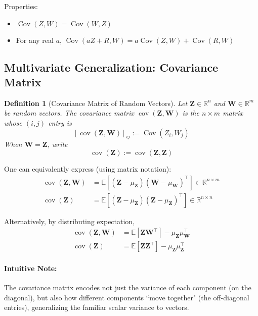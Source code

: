 \documentclass[12pt]{article}
\newtheorem{definition}{Definition}[section]
\begin{document}
Properties:
\begin{itemize}
    \item $\operatorname{Cov}(Z, W) = \operatorname{Cov}(W, Z)$
    \item For any real $a$, $\operatorname{Cov}(a Z + R, W) = a \operatorname{Cov}(Z, W) + \operatorname{Cov}(R, W)$
\end{itemize}

\subsection{Multivariate Generalization: Covariance Matrix}

\begin{definition}[Covariance Matrix of Random Vectors]
Let $\boldsymbol{Z} \in \mathbb{R}^n$ and $\boldsymbol{W} \in \mathbb{R}^m$ be random vectors.
The \emph{covariance matrix} $\operatorname{cov}(\boldsymbol{Z}, \boldsymbol{W})$ is the $n \times m$ matrix whose $(i,j)$ entry is
\[
    [\operatorname{cov}(\boldsymbol{Z}, \boldsymbol{W})]_{ij} := \operatorname{Cov}(Z_i, W_j)
\]
When $\boldsymbol{W} = \boldsymbol{Z}$, write
\[
    \operatorname{cov}(\boldsymbol{Z}) := \operatorname{cov}(\boldsymbol{Z}, \boldsymbol{Z})
\]
\end{definition}

\noindent
One can equivalently express (using matrix notation):
\begin{align}
    \operatorname{cov}(\boldsymbol{Z}, \boldsymbol{W}) 
        &= \mathbb{E} \left[\left(\boldsymbol{Z} - \mu_{\boldsymbol{Z}}\right)\left(\boldsymbol{W} - \mu_{\boldsymbol{W}}\right)^\top \right] \in \mathbb{R}^{n \times m} \\
    \operatorname{cov}(\boldsymbol{Z}) 
        &= \mathbb{E}\left[ \left(\boldsymbol{Z} - \mu_{\boldsymbol{Z}}\right)\left(\boldsymbol{Z} - \mu_{\boldsymbol{Z}}\right)^\top \right] \in \mathbb{R}^{n \times n}
\end{align}

Alternatively, by distributing expectation,
\begin{align}
    \operatorname{cov}(\boldsymbol{Z}, \boldsymbol{W}) 
        &= \mathbb{E}[\boldsymbol{Z} \boldsymbol{W}^\top] - \mu_{\boldsymbol{Z}}\mu_{\boldsymbol{W}}^\top \\
    \operatorname{cov}(\boldsymbol{Z}) 
        &= \mathbb{E}[\boldsymbol{Z}\boldsymbol{Z}^\top] - \mu_{\boldsymbol{Z}}\mu_{\boldsymbol{Z}}^\top
\end{align}

\paragraph{Intuitive Note:} The covariance matrix encodes not just the variance of each component (on the diagonal), but also how different components ``move together" (the off-diagonal entries), generalizing the familiar scalar variance to vectors.
\end{document}

